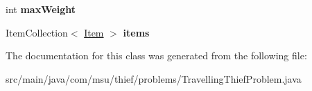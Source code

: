 \begin{DoxyCompactItemize}
\item 
\hypertarget{classcom_1_1msu_1_1thief_1_1problems_1_1TravellingThiefProblem_af0354eb7a63a60f9d0a5dd4a092d8729}{int {\bfseries max\-Weight}}\label{classcom_1_1msu_1_1thief_1_1problems_1_1TravellingThiefProblem_af0354eb7a63a60f9d0a5dd4a092d8729}

\item 
\hypertarget{classcom_1_1msu_1_1thief_1_1problems_1_1TravellingThiefProblem_a1285ed72a98b9037a92358c1bfc4c9f8}{Item\-Collection$<$ \hyperlink{classcom_1_1msu_1_1thief_1_1model_1_1Item}{Item} $>$ {\bfseries items}}\label{classcom_1_1msu_1_1thief_1_1problems_1_1TravellingThiefProblem_a1285ed72a98b9037a92358c1bfc4c9f8}

\end{DoxyCompactItemize}


The documentation for this class was generated from the following file\-:\begin{DoxyCompactItemize}
\item 
src/main/java/com/msu/thief/problems/Travelling\-Thief\-Problem.\-java\end{DoxyCompactItemize}
